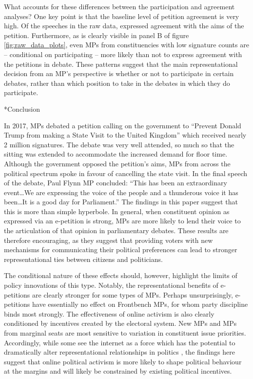 \documentclass[12pt]{article}
\makeatletter
\renewcommand{\section}{\@startsection{section}{1}{0mm}{-\baselineskip}{0.20\baselineskip}{\centering\normalfont\normalsize\scshape}}
\makeatother
\begin{document}
What accounts for these differences between the participation and agreement analyses? One key point is that the baseline level of petition agreement is very high. Of the speeches in the raw data, expressed agreement with the aims of the petition. Furthermore, as is clearly visible in panel B of figure \ref{fig:raw_data_plots}, even MPs from constituencies with low signature counts are -- conditional on participating -- more likely than not to express agreement with the petitions in debate. These patterns suggest that the main representational decision from an MP's perspective is whether or not to participate in certain debates, rather than which position to take in the debates in which they do participate. 

\section*{Conclusion}

In 2017, MPs debated a petition calling on the government to ``Prevent Donald Trump from making a State Visit to the United Kingdom'' which received nearly 2 million signatures. The debate was very well attended, so much so that the sitting was extended to accommodate the increased demand for floor time. Although the government opposed the petition's aims, MPs from across the political spectrum spoke in favour of cancelling the state visit. In the final speech of the debate, Paul Flynn MP concluded: ``This has been an extraordinary event\ldots We are expressing the voice of the people and a thunderous voice it has been\ldots It is a good day for Parliament.'' \citep{flynn2017speech} The findings in this paper suggest that this is more than simple hyperbole. In general, when constituent opinion as expressed via an e-petition is strong, MPs are more likely to lend their voice to the articulation of that opinion in parliamentary debates. These results are therefore encouraging, as they suggest that providing voters with new mechanisms for communicating their political preferences can lead to stronger representational ties between citizens and politicians. 

The conditional nature of these effects should, however, highlight the limits of policy innovations of this type. Notably, the representational benefits of e-petitions are clearly stronger for some types of MPs. Perhaps unsurprisingly, e-petitions have essentially no effect on Frontbench MPs, for whom party discipline binds most strongly. The effectiveness of online activism is also clearly conditioned by incentives created by the electoral system. New MPs and MPs from marginal seats are most sensitive to variation in constituent issue priorities. Accordingly, while some see the internet as a force which has the potential to dramatically alter representational relationships in politics \citep{coleman2009internet}, the findings here suggest that online political activism is more likely to shape political behaviour at the margins and will likely be constrained by existing political incentives. 
\end{document}
